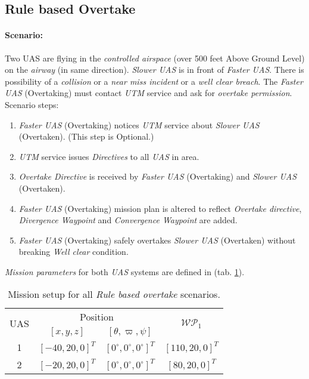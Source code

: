 \newpage
\subsection{Rule based Overtake}\label{s:testRuleOvertake}
    \paragraph{Scenario:} Two UAS are flying in the \emph{controlled airspace} (over 500 feet Above Ground Level) on the \emph{airway} (in same direction). \emph{Slower UAS} is in front of \emph{Faster UAS}. There is possibility of a \emph{collision} or a \emph{near miss incident} or a \emph{well clear breach}. The \emph{Faster UAS} (Overtaking) must contact \emph{UTM} service and ask for \emph{overtake permission}. Scenario steps:
    
    \begin{enumerate}
        \item \emph{Faster UAS} (Overtaking) notices \emph{UTM} service about \emph{Slower UAS} (Overtaken). (This step is Optional.)
        
        \item \emph{UTM} service issues \emph{Directives} to all \emph{UAS} in area.
        
        \item \emph{Overtake Directive} is received by \emph{Faster UAS} (Overtaking) and \emph{Slower UAS} (Overtaken).
        
        \item \emph{Faster UAS} (Overtaking) mission plan is altered to reflect \emph{Overtake directive}, \emph{Divergence Waypoint} and \emph{Convergence Waypoint} are added.
        
        \item \emph{Faster UAS} (Overtaking) safely overtakes \emph{Slower UAS} (Overtaken) without breaking \emph{Well clear} condition.
    \end{enumerate}
    
    \noindent\emph{Mission parameters} for both \emph{UAS} systems are defined in (tab. \ref{tab:missionSetupRuleBasedOvertakeScenarios}).
    
    \begin{table}[H]
        \centering
        \begin{tabular}{c||c|c||c}
            \multirow{2}{*}{UAS} &\multicolumn{2}{c||}{Position} & \multirow{2}{*}{$\mathscr{WP}_1$} \\\cline{2-3}
              & $[x,y,z]$           & $[\theta,\varpi,\psi]$           & \\\hline\hline
            1 & $[-40,20,0]^T $       & $[0^\circ,0^\circ,0^\circ]^T$    & $[110,20,0]^T$\\\hline 
            2 & $[-20,20,0]^T $       & $[0^\circ,0^\circ,0^\circ]^T$    & $[80,20,0]^T$\\
        \end{tabular}
        \caption{Mission setup for all \emph{Rule based overtake} scenarios.}
        \label{tab:missionSetupRuleBasedOvertakeScenarios}
    \end{table}


